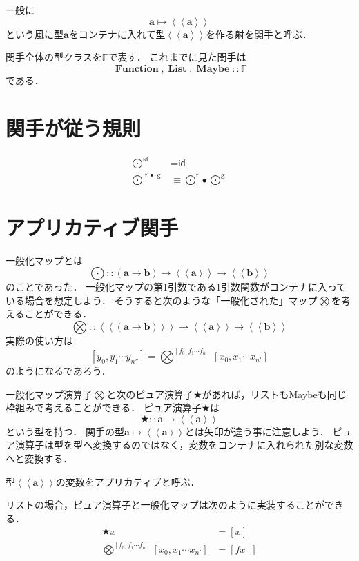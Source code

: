 \documentclass[twocolumn]{jsbook}
\newcommand{\applicativefunc}{\bigotimes} %
\newcommand{\comp}{\bullet} %
\newcommand{\guard}[1]{\mathop{\mid_{{#1}}}}
\newcommand{\mapfunc}{\bigodot} %
\newcommand{\pure}{\bigstar} %
\newcommand{\typename}[1]{\bm{#1}}
\newcommand{\typeclassname}[1]{\mathbb{#1}}
\newcommand{\functortypeclass}{\typeclassname{F}}
\newcommand{\generalcontainer}[1]{\left\langle\!\left\langle#1\right\rangle\!\right\rangle}
\newcommand{\listtype}[1]{\left[#1\right]}
\newcommand{\functor}[1]{\mathop{\textbf{#1}}}
\newcommand{\functionfunctor}{\mathop{\functor{Function}}}
\newcommand{\listfunctor}{\mathop{\functor{List}}}
\newcommand{\maybefunctor}{\mathop{\functor{Maybe}}}
\newcommand{\specialkeyword}[1]{\textsf{#1}}
\newcommand{\identity}{\specialkeyword{id}}
\begin{document}
一般に$$\typename{a}\mapsto\generalcontainer{\typename{a}}$$という風に型$\typename{a}$をコンテナに入れて型$\generalcontainer{\typename{a}}$を作る射を関手と呼ぶ．

関手全体の型クラスを$\functortypeclass$で表す．
これまでに見た関手は$$\functionfunctor,\listfunctor,\maybefunctor::\functortypeclass$$である．


\section{関手が従う規則}

\begin{align}
\mapfunc^\identity&=\identity\\
\mapfunc^{\functor{f}\comp\functor{g}}&\equiv\mapfunc^{\functor{f}}\comp\mapfunc^{\functor{g}}
\end{align}

\section{アプリカティブ関手}

一般化マップとは$$\mapfunc::(\typename{a}\rightarrow\typename{b})\rightarrow\generalcontainer{\typename{a}}\rightarrow\generalcontainer{\typename{b}}$$のことであった．
一般化マップの第1引数である1引数関数がコンテナに入っている場合を想定しよう．
そうすると次のような「一般化された」マップ$\applicativefunc$を考えることができる．
$$\applicativefunc::\generalcontainer{(\typename{a}\rightarrow\typename{b})}\rightarrow\generalcontainer{\typename{a}}\rightarrow\generalcontainer{\typename{b}}$$
実際の使い方は$$\listtype{y_0,y_1\dotsb y_{n''}}=\applicativefunc^{\listtype{f_0,f_1\dotsb f_n}}\listtype{x_0,x_1\dotsb x_{n'}}$$のようになるであろう．

一般化マップ演算子$\applicativefunc$と次のピュア演算子$\pure$があれば，リストもMaybeも同じ枠組みで考えることができる．
ピュア演算子$\pure$は$$\pure::\typename{a}\rightarrow\generalcontainer{\typename{a}}$$という型を持つ．
関手の型$\typename{a}\mapsto\generalcontainer{\typename{a}}$とは矢印が違う事に注意しよう．
ピュア演算子は型を型へ変換するのではなく，変数をコンテナに入れられた別な変数へと変換する．

型$\generalcontainer{\typename{a}}$の変数をアプリカティブと呼ぶ．

リストの場合，ピュア演算子と一般化マップは次のように実装することができる．
\begin{align*}
\pure x&=\listtype{x}\\
\applicativefunc^{\listtype{f_0,f_1\dotsb f_n}}\listtype{x_0,x_1\dotsb x_{n'}}&=\listtype{fx\guard{f\in\listtype{f_0,f_1\dotsb f_n},x\in\listtype{x_0,x_1\dotsb x_{n'}}}}
\end{align*}
\end{document}
